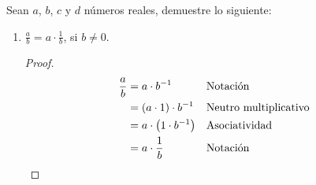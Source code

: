 \documentclass[11pt]{article}
\begin{document}
Sean $a$, $b$, $c$ y $d$ números reales, demuestre lo siguiente:

\begin{enumerate}[label=\alph*)]
    \item $\frac{a}{b}=a\cdot \frac{1}{b}$, si $b\neq 0$.%
    \vspace{-1em}
    \begin{proof} 
    \begin{align*}
        \frac{a}{b} &= a\cdot b^{-1} && \text{Notación}\\
        &= (a\cdot 1) \cdot b^{-1} && \text{Neutro multiplicativo}\\
        &= a\cdot \bigl(1\cdot b^{-1}\bigr) && \text{Asociatividad}\\
        &= a\cdot \frac{1}{b} && \text{Notación} \qedhere
    \end{align*}
    \end{proof} \vspace{-1em}


\end{enumerate}
\end{document}
